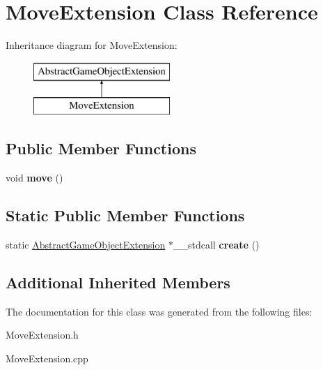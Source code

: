 \hypertarget{class_move_extension}{}\section{Move\+Extension Class Reference}
\label{class_move_extension}
Inheritance diagram for Move\+Extension\+:\begin{figure}[H]
\begin{center}
\leavevmode
\includegraphics[height=2.000000cm]{class_move_extension}
\end{center}
\end{figure}
\subsection*{Public Member Functions}
\begin{DoxyCompactItemize}
\item 
\mbox{\label{class_move_extension_a8970d97c5d87073eb2255bb1b29fd8fc}} 
void {\bfseries move} ()
\end{DoxyCompactItemize}
\subsection*{Static Public Member Functions}
\begin{DoxyCompactItemize}
\item 
\mbox{\label{class_move_extension_a45554f4b247dd795a9e8e71614ab677a}} 
static \mbox{\hyperlink{class_abstract_game_object_extension}{Abstract\+Game\+Object\+Extension}} $\ast$\+\_\+\+\_\+stdcall {\bfseries create} ()
\end{DoxyCompactItemize}
\subsection*{Additional Inherited Members}


The documentation for this class was generated from the following files\+:\begin{DoxyCompactItemize}
\item 
Move\+Extension.\+h\item 
Move\+Extension.\+cpp\end{DoxyCompactItemize}
